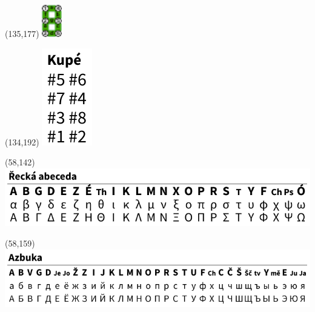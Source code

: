 \documentclass{extarticle}
\begin{document}
\begin{textblock}{0}(135,177)%
\vfill
{\includegraphics[height=1.4cm]{tools/images/segment-numbering.pdf}}
\vfill
\end{textblock}

\begin{textblock}{0}(134,192)%
\vfill
{\includegraphics[scale=0.7]{tools/train.pdf}}
\vfill
\end{textblock}


\begin{textblock}{0}(58,142)%
\vfill
{\includegraphics[scale=0.7]{tools/greek.pdf}}
\vfill
\end{textblock}

\begin{textblock}{0}(58,159)%
\vfill
{\includegraphics[scale=0.7]{tools/cyrillic.pdf}}
\vfill
\end{textblock}
\end{document}
